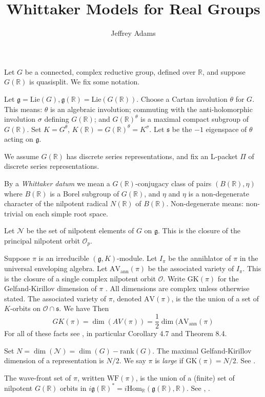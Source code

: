 \documentclass[10pt,leqno]{article}
\newcommand{\Hom}{\mathrm{Hom}}
\renewcommand{\O}{\mathcal O}
\newcommand{\R}{\mathbb R}
\newcommand{\N}{\mathcal N}
\newcommand{\Lie}{\mathrm{Lie}}
\newcommand{\g}{\mathfrak g}
\newcommand{\s}{\mathfrak s}
\newcommand{\AV}{\mathrm{AV}}
\newcommand{\WF}{\mathrm{WF}}
\newcommand{\AVann}{\mathrm{AV}_{\mathrm{ann}}}
\newcommand{\GK}{\mathrm{GK}}
\newcommand{\Op}{\O_p}
\begin{document}
\title{Whittaker Models for Real Groups}
\author{Jeffrey Adams}
\maketitle

Let $G$ be a connected, complex reductive group, defined over $\R$, and suppose $G(\R)$ is quasisplit.
We fix some notation.

Let $\g=\Lie(G), \g(\R)=\Lie(G(\R))$. Choose a Cartan involution $\theta$ for $G$. This means:
$\theta$ is an algebraic involution; commuting with the anti-holomorphic involution $\sigma$ defining $G(\R)$;
and $G(\R)^\theta$ is a maximal compact subgroup of $G(\R)$. Set $K=G^\theta$, $K(\R)=G(\R)^\theta=K^\sigma$.
Let $\s$ be the $-1$ eigenspace of $\theta$ acting on $\g$.

We assume $G(\R)$ has discrete series representations, and fix an L-packet $\Pi$ of discrete series representations.

By a  {\it Whittaker datum} we mean a $G(\R)$-conjugacy class of pairs  $(B(\R),\eta)$ where $B(\R)$ is a
Borel subgroup of $G(\R)$, and $\eta$
and $\eta$ is a non-degenerate character of the nilpotent radical $N(\R)$ of $B(\R)$. Non-degenerate means: non-trivial on each simple root space.


Let $\N$ be the set of nilpotent elements of $G$ on $\g$.
This is the closure of the principal nilpotent orbit $\Op$.

Suppose $\pi$ is an irreducible $(\g,K)$-module. Let $I_\pi$ be the annihlator of $\pi$ in the universal enveloping algebra.
Let $\AVann(\pi)$ be the associated variety of $I_\pi$. 
This is the closure of a single complex nilpotent orbit $\O$.
Write $\GK(\pi)$ for the Gelfand-Kirillov dimension of $\pi$
\cite{vogan-gelfand-kirillov}. 
All dimensions are complex unless otherwise stated.
The associated variety of $\pi$, denoted $\AV(\pi)$, is the  the union of a set of
$K$-orbits on $\O\cap\s$.
We have
Then
$$
GK(\pi)=\dim(AV(\pi))=\frac12\dim(\AVann(\pi)
$$
For all of these facts see \cite{vogan_bowdoin}, in particular Corollary 4.7 and Theorem 8.4.

Set $N=\dim(\N)=\dim(G)-\mathrm{rank}(G)$. The maximal Gelfand-Kirillov dimension of a representation is $N/2$.
We say $\pi$ is {\it large} if $\GK(\pi)=N/2$. See \cite[Section 6]{Vogan78}.


The wave-front set of $\pi$, written $\WF(\pi)$, is the union of a (finite) set of nilpotent $G(\R)$ orbits in
$i\g(\R)^*=i\Hom_\R(\g(\R),\R)$. See \cite{howe_wave_front}, \cite{bv_local_structure}.
\end{document}
